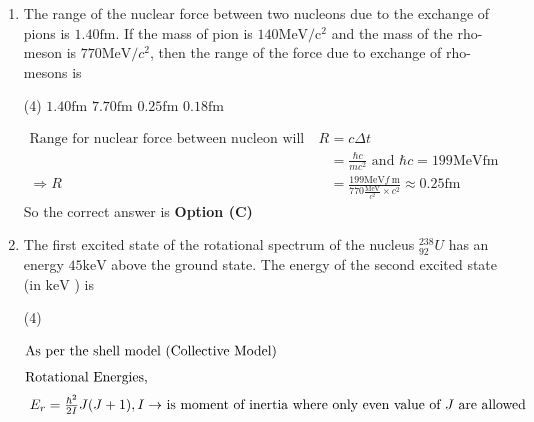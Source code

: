 \begin{enumerate}
{}
\begin{tasks}(4)
\task[\textbf{A.}] $57 Q / 58$
\task[\textbf{B.}]  $Q / 57$
\task[\textbf{C.}] $Q / 58$
\task[\textbf{D.}] $23 Q / 58$
\end{tasks}
\begin{answer}
\begin{align*}
\intertext{Energy carried by the $\propto-$ particle is}
K E_{\alpha}&=\left(\frac{A-4}{A}\right) Q=\frac{228}{232} Q=\frac{57}{58} Q
\end{align*}
So the correct answer is \textbf{Option (A)}
\end{answer}
	\item The range of the nuclear force between two nucleons due to the exchange of pions is $1.40 \mathrm{fm}$. If the mass of pion is $140 \mathrm{MeV} / \mathrm{c}^{2}$ and the mass of the rho-meson is $770 \mathrm{MeV} / c^{2}$, then the range of the force due to exchange of rho-mesons is
{	}
\begin{tasks}(4)
\task[\textbf{A.}] $1.40 \mathrm{fm}$
\task[\textbf{B.}] $7.70 \mathrm{fm}$
\task[\textbf{C.}] $0.25 \mathrm{fm}$
\task[\textbf{D.}]  $0.18 \mathrm{fm}$
\end{tasks}
\begin{answer}
\begin{align*}
\text{Range for nuclear force between nucleon will be }R&=c \Delta t\\&=\frac{\hbar c}{m c^{2}}\text{ and }\hbar c=199 \mathrm{MeVfm}\\
\Rightarrow R&=\frac{199 \mathrm{MeV} f \mathrm{~m}}{770 \frac{\mathrm{MeV}}{c^{2}} \times c^{2}} \approx 0.25 \mathrm{fm}
\end{align*}
So the correct answer is \textbf{Option (C)}
\end{answer}
\item The first excited state of the rotational spectrum of the nucleus ${ }_{92}^{238} U$ has an energy $45 \mathrm{keV}$ above the ground state. The energy of the second excited state (in $\mathrm{keV}$ ) is
{}
\begin{tasks}(4)
\end{tasks}
\begin{answer}
\begin{align*}
\intertext{As per the shell model (Collective Model)}
\intertext{Rotational Energies,}
\intertext{	$E_{r}=\frac{\hbar^{2}}{2 I} J(J+1), I \rightarrow$ is moment of inertia where only even value of $J$ are allowed}

\end{align*}
\end{answer}
\end{enumerate}
